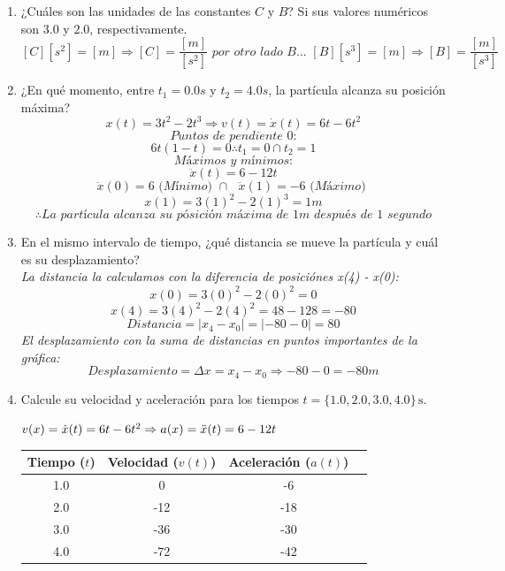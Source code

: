 \documentclass{article}
\begin{document}
\begin{enumerate}
  \item ¿Cuáles son las unidades de las constantes \(C\) y \(B\)? Si sus valores numéricos son \(3.0\) y \(2.0\), respectivamente.
  \[
  [C][s^2] = [m] \Rightarrow [C] =  \frac{[m]}{[s^2]} \textit{  por otro lado B...  }
  [B][s^3] = [m] \Rightarrow [B] =  \frac{[m]}{[s^3]}
  \]
  
  \item ¿En qué momento, entre \(t_1 = 0.0s\) y \(t_2 = 4.0s\), la partícula alcanza su posición máxima? \\
  \[  x(t) = 3t^2 - 2t^3 \Rightarrow v(t) = \dot{x}(t) = 6t - 6t^2  \]
  \[ \textit{Puntos de pendiente 0:} \]
  \[ 6t (1-t) = 0 \therefore t_1 = 0 \cap t_2 = 1 \]
  \[ \textit{Máximos y mínimos:} \]
  \[ \ddot{x}(t) = 6 - 12t \]
  \[ \ddot{x}(0) = 6 \textit{  (Mínimo)  } \cap \textit{  }\ddot{x}(1) = -6 \textit{  (Máximo)  } \]
  \[ x(1) = 3(1)^2 - 2(1)^3 = 1m \]
  \[ \therefore \textit{La partícula alcanza su pósición máxima de 1m después de 1 segundo} \]
  
  
  \item En el mismo intervalo de tiempo, ¿qué distancia se mueve la partícula y cuál es su desplazamiento?\\
  \textit{La distancia la calculamos con la diferencia de posiciónes x(4) - x(0):}
  \[x(0) = 3(0)^2 - 2(0)^2 = 0\]
  \[x(4) = 3(4)^2 - 2(4)^2 = 48 - 128 = -80\]
  \[Distancia = |x_4-x_0| = |-80 - 0| = 80\]
  \textit{El desplazamiento con la suma de distancias en puntos importantes de la gráfica:}
  \[  Desplazamiento = \Delta x = x_4 - x_0 \Rightarrow -80 - 0 = -80m  \]
  \item Calcule su velocidad y aceleración para los tiempos \(t = \{1.0, 2.0, 3.0, 4.0\} \, \text{s}\).

\begin{center}
\(
v(x) = \dot{x}(t) = 6t - 6t^2 \Rightarrow a(x) = \ddot{x}(t) = 6 - 12t\\
\)
  \begin{tabular}{|c|c|c|c|}
    \hline
    Tiempo (\(t\)) & Velocidad (\(v(t)\)) & Aceleración (\(a(t)\)) \\
    \hline
    1.0 & 0 & -6 \\
    2.0 & -12 & -18 \\
    3.0 & -36 & -30 \\
    4.0 & -72 & -42 \\
    \hline
  \end{tabular}
\end{center}


\end{enumerate}
\end{document}
